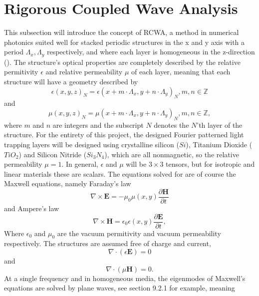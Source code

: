 \section{Rigorous Coupled Wave Analysis}
\label{sec:rcwa}
This subsection will introduce the concept of RCWA, a method in numerical photonics suited well
for stacked periodic structures in the x and y axis with a period $\Lambda_x,\Lambda_y$ respectively, and where each layer is homogeneous in the z-direction (\cite{torcwa}).
The structure's optical properties are completely described by the relative permitivity $\epsilon$ and relative permeability $\mu$ of each layer, meaning that each structure
will have a geometry described by
\begin{equation}
\label{eq:permittivity_periodicity}
\epsilon(x,y,z)_N = \epsilon(x + m \cdot \Lambda_x, y + n \cdot \Lambda_y)_N, m,n \in \mathbb{Z}
\end{equation}
and 
\begin{equation}
\label{eq:permeability_periodicity}
\mu(x,y,z)_N = \mu(x + m \cdot \Lambda_x, y + n \cdot \Lambda_y)_N, m,n \in \mathbb{Z},
\end{equation}
where $m$ and $n$ are integers and the subscript $N$ denotes the $N$'th layer of the structure. For the entirety of this project, the designed
Fourier patterned light trapping layers will be designed using crystalline silicon ($Si$), Titanium Dioxide ($TiO_2$) and Silicon Nitride ($Si_3N_4$), which
are all nonmagnetic, so the relative permeability $\mu = 1$. In general, $\epsilon$ and $\mu$ will be $3 \times 3$ tensors, but for isotropic and linear materials these are scalars.
The equations solved for are of course the Maxwell equations, namely Faraday's law
\begin{equation}
\label{eq:faraday}
\nabla \times \mathbf{E} = -\mu_0\mu(x,y)\frac{\partial\mathbf{H}}{\partial t}
\end{equation}
and Ampere's law
\begin{equation}
\label{eq:ampere}
\nabla \times \mathbf{H} = \epsilon_0\epsilon(x,y)\frac{\partial\mathbf{E}}{\partial t},
\end{equation}
Where $\epsilon_0$ and $\mu_0$ are the vacuum permitivity and vacuum permeability respectively. The structures are assumed free of charge and current,
$$
\nabla \cdot (\epsilon \mathbf{E}) = 0
$$
and
$$
\nabla \cdot (\mu \mathbf{H}) = 0.
$$
At a single frequency and in homogeneous media, the eigenmodes of Maxwell's equations are solved by plane waves, see \cite{griffiths} section 9.2.1 for example,
meaning

